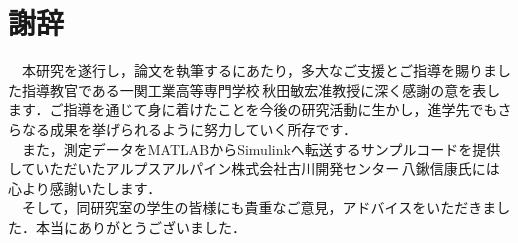 \chapter*{謝辞}
　本研究を遂行し，論文を執筆するにあたり，多大なご支援とご指導を賜りました指導教官である一関工業高等専門学校\,秋田敏宏准教授に深く感謝の意を表します．ご指導を通じて身に着けたことを今後の研究活動に生かし，進学先でもさらなる成果を挙げられるように努力していく所存です．\\
　また，測定データをMATLABからSimulinkへ転送するサンプルコードを提供していただいたアルプスアルパイン株式会社古川開発センター\,八鍬信康氏には心より感謝いたします．\\
　そして，同研究室の学生の皆様にも貴重なご意見，アドバイスをいただきました．本当にありがとうございました．
